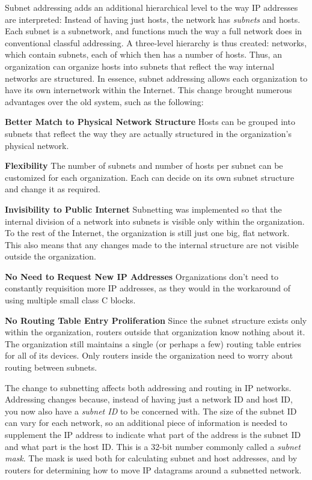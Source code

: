 Subnet addressing adds an additional hierarchical level to the way IP
addresses are interpreted: Instead of having just hosts, the network has
{\emph{subnets}} and hosts. Each subnet is a subnetwork, and functions
much the way a full network does in conventional classful addressing. A
three-level hierarchy is thus created: networks, which contain subnets,
each of which then has a number of hosts. Thus, an organization can
organize hosts into subnets that reflect the way internal networks are
structured. In essence, subnet addressing allows each organization to
have its own internetwork within the Internet. This change brought
numerous advantages over the old system, such as the following:

{\textbf{Better Match to Physical Network Structure}} Hosts can be
grouped into subnets that reflect the way they are actually structured
in the organization's physical network.

{\textbf{Flexibility}} The number of subnets and number of hosts per
subnet can be customized for each organization. Each can decide on its
own subnet structure and change it as required.

{\textbf{Invisibility to Public Internet}} Subnetting was implemented so
that the internal division of a network into subnets is visible only
within the organization. To the rest of the Internet, the organization
is still just one big, flat network. This also means that any changes
made to the internal structure are not visible outside the organization.

{\textbf{No Need to Request New IP Addresses}} Organizations don't need
to constantly requisition more IP addresses, as they would in the
workaround of using multiple small class C blocks.

{\textbf{No Routing Table Entry Proliferation}} Since the subnet
structure exists only within the organization, routers outside that
organization know nothing about it. The organization still maintains a
single (or perhaps a few) routing table entries for all of its devices.
Only routers inside the organization need to worry about routing between
subnets.

The change to subnetting affects both addressing and routing in IP
networks. Addressing changes because, instead of having just a network
ID and host ID, you now also have a {\emph{subnet ID}} to be concerned
with. The size of the subnet ID can vary for each network, so an
additional piece of information is needed to supplement the IP address
to indicate what part of the address is the subnet ID and what part is
the host ID. This is a 32-bit number commonly called a {\emph{subnet
mask}}. The mask is used both for calculating subnet and host addresses,
and by routers for determining how to move IP datagrams around a
subnetted network.

